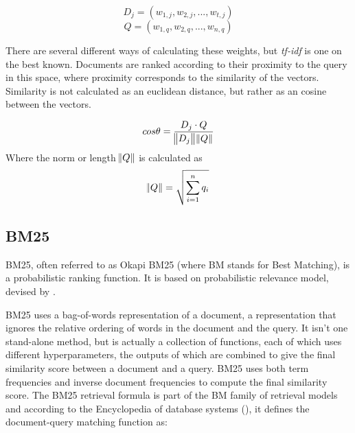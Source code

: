 \begin{equation}
D_j = (w_{1,j}, w_{2,j},...,w_{t,j})
\end{equation}
\begin{equation}
Q = (w_{1,q}, w_{2,q},...,w_{n,q}) 
\end{equation}

There are several different ways of calculating these weights, but \textit{tf-idf} is one on the best known. Documents are ranked according to their proximity to the query in this space, where proximity corresponds to the similarity of the vectors. Similarity is not calculated as an euclidean distance, but rather as an cosine between the vectors.

\begin{equation}
cos\theta = \frac{D_j \cdot Q}{\norm{D_j} \norm{Q}}  
\end{equation} 
Where the norm or length $ \norm{Q} $ is calculated as
\begin{equation}
\norm{Q} = \sqrt{\sum\limits_{i=1}^n q_i }  
\end{equation}


\subsection{BM25}

BM25, often referred to as Okapi BM25 (where BM stands for Best Matching), is a probabilistic ranking function. It is based on probabilistic relevance model, devised by \citep{robertson1996okapi}. 

BM25 uses a bag-of-words representation of a document, a representation that ignores the relative ordering of words in the document and the query. It isn't one stand-alone method, but is actually a collection of functions, each of which uses different hyperparameters, the outputs of which are combined to give the final similarity score between a document and a query. BM25 uses both term frequencies and inverse document frequencies to compute the final similarity score. The BM25 retrieval formula is part of the BM family of retrieval models and according to the Encyclopedia of database systems (\citep{amati2009bm25}), it defines the document-query matching function as:

